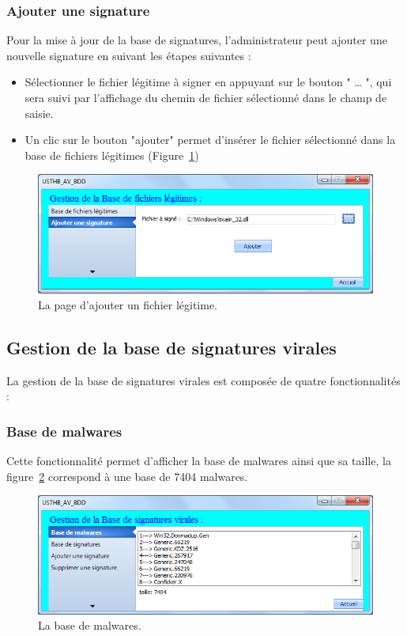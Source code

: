 \subsubsection{Ajouter une signature}
Pour la mise à jour de la base de signatures, l'administrateur peut ajouter une nouvelle signature en suivant les étapes suivantes :\\
\begin{itemize}
\item Sélectionner le fichier légitime à signer en appuyant sur le bouton " … ", qui sera suivi par l'affichage du chemin de fichier sélectionné dans le champ de saisie.
\item Un clic  sur le bouton "ajouter" permet d'insérer le fichier sélectionné dans la base de fichiers légitimes (Figure~\ref{fig :im5})
\end{itemize}
\begin{figure}[H]
\begin{center}
\includegraphics[scale=0.7]{Figures/im5.png}
\caption{La page d'ajouter un fichier légitime.}
\label{fig :im5} 
\end{center}
\end{figure}


\subsection{Gestion de la base de signatures virales}
La gestion de la base de signatures virales est composée de quatre fonctionnalités : 

\subsubsection{Base de malwares} 
Cette fonctionnalité permet d'afficher la base de malwares ainsi que sa taille, la figure~\ref{fig :im12} correspond à une base de 7404 malwares.
\begin{figure}[H]
\begin{center}
\includegraphics[scale=0.7]{Figures/im12.png}
\caption{La base de malwares.}
\label{fig :im12} 
\end{center}
\end{figure}

